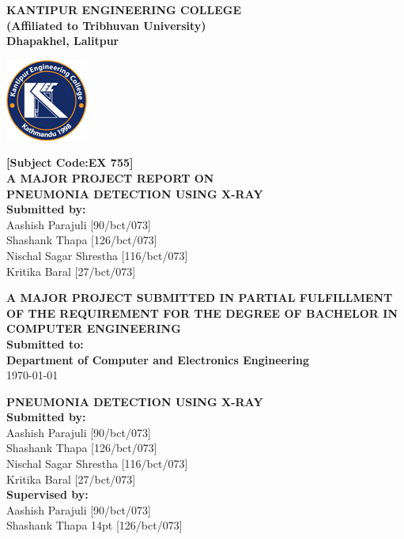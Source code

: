 \documentclass[12pt, a4paper]{report}
\begin{document}
\begin{titlepage}
\begin{center}
\vfill
\Large{\textbf{KANTIPUR ENGINEERING COLLEGE}}\\
\large{\textbf{(Affiliated to Tribhuvan University)}}\\
\large{\textbf{Dhapakhel, Lalitpur}}\\
\vfill	%

\includegraphics[scale=1]{logo.png}

\vfill
\large{\textbf{[Subject Code:EX 755]}}\\ %
\large{\textbf{A MAJOR PROJECT  REPORT ON  }}\\ %
\Large{\textbf{PNEUMONIA DETECTION USING X-RAY  }}\\

\vfill	%
\large{\textbf{Submitted by:}}\\

{\normalsize Aashish Parajuli [90/bct/073]\\
Shashank Thapa  [126/bct/073]\\
Nischal Sagar Shrestha  [116/bct/073]\\ 
Kritika Baral [27/bct/073]\\
}


\vfill	%
\textbf{A MAJOR PROJECT SUBMITTED IN PARTIAL FULFILLMENT OF THE REQUIREMENT FOR THE DEGREE OF BACHELOR IN COMPUTER ENGINEERING}\\

\vfill	%
\large{\textbf{Submitted to:\\
Department of Computer and Electronics Engineering}}\\
\vfill
\today	
\vfill
\pagebreak
\newpage

\large{\textbf{PNEUMONIA DETECTION USING X-RAY}}\\
\vfill
\large{\textbf{Submitted by:}}\\
{\normalsize Aashish Parajuli [90/bct/073]\\
Shashank Thapa  [126/bct/073]\\
Nischal Sagar Shrestha [116/bct/073]\\ 
Kritika Baral [27/bct/073]\\
}
\vfill
\large{\textbf{Supervised by:}}\\
{\normalsize Aashish Parajuli [90/bct/073]\\
Shashank Thapa {14pt} [126/bct/073]\\

}
\end{center}
\end{titlepage}
\end{document}
